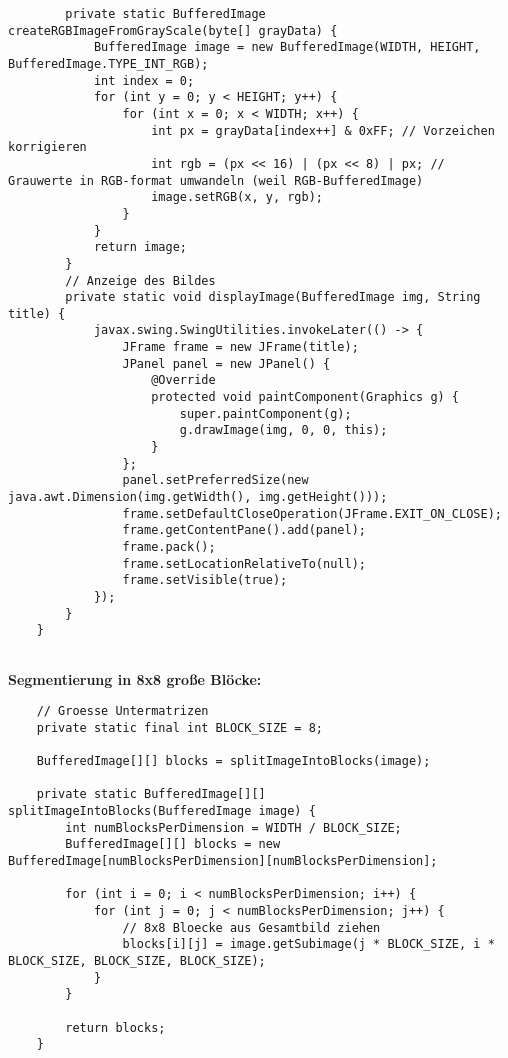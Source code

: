\documentclass[12pt]{article}
\begin{document}
\begin{lstlisting}
		private static BufferedImage createRGBImageFromGrayScale(byte[] grayData) {
			BufferedImage image = new BufferedImage(WIDTH, HEIGHT, BufferedImage.TYPE_INT_RGB);
			int index = 0;
			for (int y = 0; y < HEIGHT; y++) {
				for (int x = 0; x < WIDTH; x++) {
					int px = grayData[index++] & 0xFF; // Vorzeichen korrigieren
					int rgb = (px << 16) | (px << 8) | px; // Grauwerte in RGB-format umwandeln (weil RGB-BufferedImage)
					image.setRGB(x, y, rgb);
				}
			}
			return image;
		}
		// Anzeige des Bildes
		private static void displayImage(BufferedImage img, String title) {
			javax.swing.SwingUtilities.invokeLater(() -> {
				JFrame frame = new JFrame(title);
				JPanel panel = new JPanel() {
					@Override
					protected void paintComponent(Graphics g) {
						super.paintComponent(g);
						g.drawImage(img, 0, 0, this);
					}
				};
				panel.setPreferredSize(new java.awt.Dimension(img.getWidth(), img.getHeight()));
				frame.setDefaultCloseOperation(JFrame.EXIT_ON_CLOSE);
				frame.getContentPane().add(panel);
				frame.pack();
				frame.setLocationRelativeTo(null);
				frame.setVisible(true);
			});
		}
	}
	
\end{lstlisting} 			
	\vspace{1.0cm}
\textbf{Segmentierung in 8x8 große Blöcke:}
\begin{lstlisting}
	// Groesse Untermatrizen
	private static final int BLOCK_SIZE = 8;
	
	BufferedImage[][] blocks = splitImageIntoBlocks(image);
	
	private static BufferedImage[][] splitImageIntoBlocks(BufferedImage image) {
		int numBlocksPerDimension = WIDTH / BLOCK_SIZE;
		BufferedImage[][] blocks = new BufferedImage[numBlocksPerDimension][numBlocksPerDimension];
		
		for (int i = 0; i < numBlocksPerDimension; i++) {
			for (int j = 0; j < numBlocksPerDimension; j++) {
				// 8x8 Bloecke aus Gesamtbild ziehen
				blocks[i][j] = image.getSubimage(j * BLOCK_SIZE, i * BLOCK_SIZE, BLOCK_SIZE, BLOCK_SIZE);
			}
		}
		
		return blocks;
	}
\end{lstlisting} 
		
	
\end{document}
